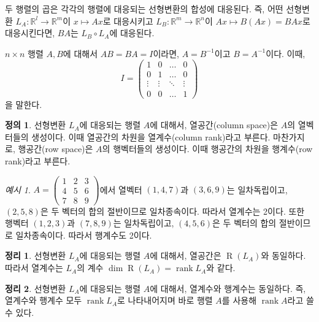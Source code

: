 \documentclass[unfonts,oneside,a4paper]{oblivoir}
\theoremstyle{definition}
\newtheorem{definition}{정의}[section]
\theoremstyle{theorem}
\newtheorem{theorem}{정리}[section]
\theoremstyle{theorem}
\theoremstyle{remark}
\theoremstyle{remark}
\theoremstyle{remark}
\newtheorem*{example}{예시}
\theoremstyle{remark}
\renewcommand{\vec}[1]{\bm{\mathit{#1}}}
\DeclareMathOperator{\Range}{R}
\DeclareMathOperator{\rank}{rank}
\begin{document}
두 행렬의 곱은 각각의 행렬에 대응되는 선형변환의 합성에 대응된다.
즉, 어떤 선형변환 $L_A: \mathbb R^l \rightarrow \mathbb R^m$이 $\vec x \mapsto A \vec x$로 대응시키고 $L_B: \mathbb R^m \rightarrow \mathbb R^n$이 $A \vec x \mapsto B(A \vec x) = BA \vec x$로 대응시킨다면, $BA$는 $L_B \circ L_A$에 대응된다.

$n \times n$ 행렬 $A, B$에 대해서 $AB = BA = I$이라면, $A = B^{-1}$이고 $B = A^{-1}$이다.
이때,
\begin{equation*}
    I = \begin{pmatrix}
        1 & 0 & \dots & 0\\
        0 & 1 & \dots & 0\\
        \vdots & \vdots & \ddots & \vdots\\
        0 & 0 & \dots & 1
    \end{pmatrix}
\end{equation*}
을 말한다.

\begin{definition}
    선형변환 $L_A$에 대응되는 행렬 $A$에 대해서, 열공간(column space)은 $A$의 열벡터들의 생성이다.
    이때 열공간의 차원을 열계수(column rank)라고 부른다.
    마찬가지로, 행공간(row space)은 $A$의 행벡터들의 생성이다.
    이때 행공간의 차원을 행계수(row rank)라고 부른다.
\end{definition}

\begin{example}
    $A = \begin{pmatrix}
        1 & 2 & 3\\
        4 & 5 & 6\\
        7 & 8 & 9
    \end{pmatrix}$에서 열벡터 $(1, 4, 7)$과 $(3, 6, 9)$는 일차독립이고, $(2, 5, 8)$은 두 벡터의 합의 절반이므로 일차종속이다.
    따라서 열계수는 2이다.
    또한 행벡터 $(1, 2, 3)$과 $(7, 8, 9)$는 일차독립이고, $(4, 5, 6)$은 두 벡터의 합의 절반이므로 일차종속이다.
    따라서 행계수도 2이다.
\end{example}

\begin{theorem} \label{thm:rank_matrix}
    선형변환 $L_A$에 대응되는 행렬 $A$에 대해서, 열공간은 $\Range(L_A)$와 동일하다.
    따라서 열계수는 $L_A$의 계수 $\dim \Range(L_A) = \rank L_A$와 같다.
\end{theorem}

\begin{theorem} \label{thm:rank}
    선형변환 $L_A$에 대응되는 행렬 $A$에 대해서, 열계수와 행계수는 동일하다.
    즉, 열계수와 행계수 모두 $\rank L_A$로 나타내어지며 바로 행렬 $A$를 사용해 $\rank A$라고 쓸 수 있다.
\end{theorem}
\end{document}
